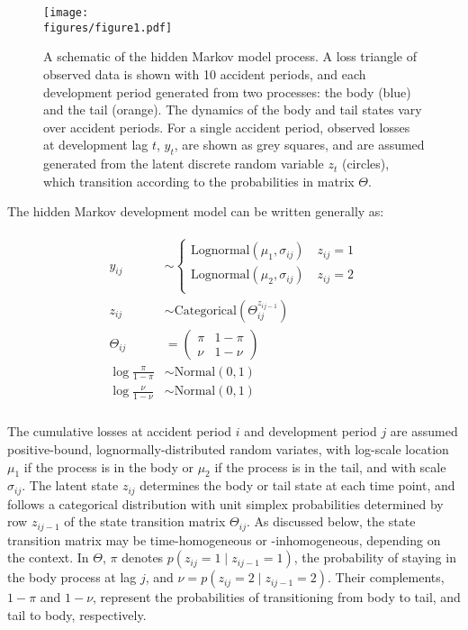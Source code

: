 \begin{figure}[t!]
    \centering
    \texttt{[image: \\figures/figure1.pdf]}
    \caption{
        A schematic of the hidden Markov model process.
        A loss triangle of observed data is shown
        with 10 accident periods, and each
        development period generated from
        two processes: the body (blue)
        and the tail (orange). The dynamics of the
        body and tail states vary over accident periods.
        For a single accident
        period, observed losses at
        development lag $t$, $y_{t}$, are shown as grey
        squares, and are assumed generated from the latent
        discrete random variable $z_{t}$ (circles), 
        which transition according to the probabilities
        in matrix $\Theta$.
    }
	\label{fig:schematic}
\end{figure}

The hidden Markov development model can be
written generally as:

\begin{align}
	\begin{split}
	\label{eq:hmm}
	y_{ij} &\sim \begin{cases}
		\mathrm{Lognormal}(\mu_{1}, \sigma_{ij}) \quad z_{ij} = 1\\
		\mathrm{Lognormal}(\mu_{2}, \sigma_{ij}) \quad z_{ij} = 2\\
	\end{cases}\\
    z_{ij} &\sim \mathrm{Categorical}(\Theta^{z_{ij-1}}_{ij})\\
    \Theta_{ij} &= \begin{pmatrix}
        \pi & 1 - \pi\\
        \nu & 1 - \nu
    \end{pmatrix}\\
    \log \frac{\pi}{1 - \pi} &\sim \mathrm{Normal}(0, 1)\\
    \log \frac{\nu}{1 - \nu} &\sim \mathrm{Normal}(0, 1)\\
	\end{split}
\end{align}

The cumulative losses at accident period $i$ and development period $j$
are assumed positive-bound, lognormally-distributed random variates,
with log-scale location $\mu_{1}$ if the process is in the body
or $\mu_{2}$ if the process is in the tail, and with scale $\sigma_{ij}$.
The latent state $z_{ij}$ determines the body or tail state at each
time point, and follows a categorical distribution with unit simplex probabilities
determined by row $z_{ij - 1}$ of the state transition matrix
$\Theta_{ij}$. As discussed below, the state transition matrix
may be time-homogeneous or -inhomogeneous, depending on the context.
In $\Theta$, $\pi$ denotes $p(z_{ij} = 1 \mid z_{ij-1} = 1)$, the 
probability of staying in the body
process at lag $j$, and $\nu = p(z_{ij} = 2 \mid z_{ij-1} = 2)$.
Their complements, $1 - \pi$ and $1 - \nu$, represent the
probabilities of transitioning from body to tail, and tail
to body, respectively.

